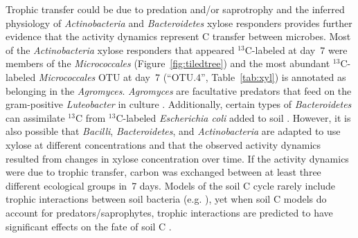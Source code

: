 Trophic transfer could be due to predation and/or saprotrophy and the inferred
physiology of \textit{Actinobacteria} and \textit{Bacteroidetes} xylose
responders provides further evidence that the activity dynamics represent 
C transfer between microbes. Most of the \textit{Actinobacteria} xylose
responders that appeared $^{13}$C-labeled at day~7 were members of the
\textit{Micrococcales} (Figure~\ref{fig:tiledtree}) and the most abundant
$^{13}$C-labeled \textit{Micrococcales} OTU at day~7 (“OTU.4”,
Table~\ref{tab:xyl}) is annotated as belonging in the \textit{Agromyces}.
\textit{Agromyces} are facultative predators that feed on the gram-positive
\textit{Luteobacter} in culture \citep{16346402}. Additionally, certain types
of \textit{Bacteroidetes} can assimilate $^{13}$C from $^{13}$C-labeled
\textit{Escherichia coli} added to soil \citep{Lueders2006}. However, it is
also possible that \textit{Bacilli}, \textit{Bacteroidetes}, and
\textit{Actinobacteria} are adapted to use xylose at different concentrations
and that the observed activity dynamics resulted from changes in xylose
concentration over time. If the activity dynamics were due to trophic transfer,
carbon was exchanged between at least three different ecological groups in~7
days. Models of the soil C cycle rarely include trophic interactions between
soil bacteria (e.g. \citep{Moore1988}), yet when soil C models do account for
predators/saprophytes, trophic interactions are predicted to have significant
effects on the fate of soil C \citep{Kaiser2014a}. 

